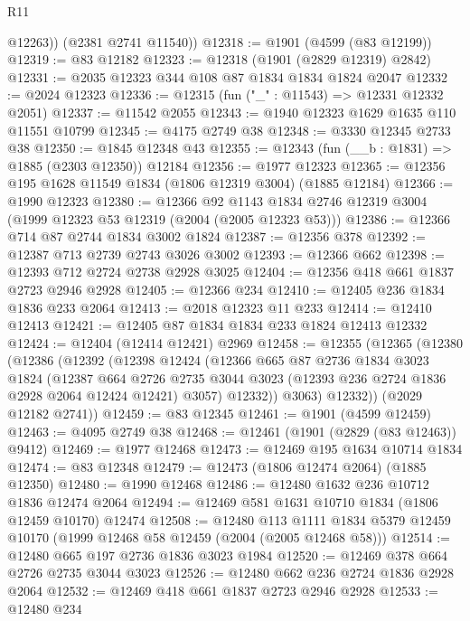 \begin{lexlean}{R11}
\begin{coremodule}
          @12263))
      (@2381 @2741 @11540))
@12318 := @1901 (@4599 (@83 @12199))
@12319 := @83 @12182
@12323 := @12318 (@1901 (@2829 @12319) @2842)
@12331 := @2035 @12323 @344 @108 @87 @1834 @1834 @1824 @2047
@12332 := @2024 @12323
@12336 := @12315 (fun ("_" : @11543) => @12331 @12332 @2051)
@12337 := @11542 @2055
@12343 := @1940 @12323 @1629 @1635 @110 @11551 @10799
@12345 := @4175 @2749 @38
@12348 := @3330 @12345 @2733 @38
@12350 := @1845 @12348 @43
@12355 := @12343 (fun (__b : @1831) => @1885 (@2303 @12350)) @12184
@12356 := @1977 @12323
@12365 := @12356 @195 @1628 @11549 @1834 (@1806 @12319 @3004) (@1885 @12184)
@12366 := @1990 @12323
@12380 := @12366
    @92
    @1143
    @1834
    @2746
    @12319
    @3004
    (@1999 @12323 @53 @12319 (@2004 (@2005 @12323 @53)))
@12386 := @12366 @714 @87 @2744 @1834 @3002 @1824
@12387 := @12356 @378
@12392 := @12387 @713 @2739 @2743 @3026 @3002
@12393 := @12366 @662
@12398 := @12393 @712 @2724 @2738 @2928 @3025
@12404 := @12356 @418 @661 @1837 @2723 @2946 @2928
@12405 := @12366 @234
@12410 := @12405 @236 @1834 @1836 @233 @2064
@12413 := @2018 @12323 @11 @233
@12414 := @12410 @12413
@12421 := @12405 @87 @1834 @1834 @233 @1824 @12413 @12332
@12424 := @12404 (@12414 @12421) @2969
@12458 := @12355
    (@12365
      (@12380
        (@12386
          (@12392
            (@12398
              @12424
              (@12366
                @665
                @87
                @2736
                @1834
                @3023
                @1824
                (@12387
                  @664
                  @2726
                  @2735
                  @3044
                  @3023
                  (@12393 @236 @2724 @1836 @2928 @2064 @12424 @12421)
                  @3057)
                @12332))
            @3063)
          @12332))
      (@2029 @12182 @2741))
@12459 := @83 @12345
@12461 := @1901 (@4599 @12459)
@12463 := @4095 @2749 @38
@12468 := @12461 (@1901 (@2829 (@83 @12463)) @9412)
@12469 := @1977 @12468
@12473 := @12469 @195 @1634 @10714 @1834
@12474 := @83 @12348
@12479 := @12473 (@1806 @12474 @2064) (@1885 @12350)
@12480 := @1990 @12468
@12486 := @12480 @1632 @236 @10712 @1836 @12474 @2064
@12494 := @12469 @581 @1631 @10710 @1834 (@1806 @12459 @10170) @12474
@12508 := @12480
    @113
    @1111
    @1834
    @5379
    @12459
    @10170
    (@1999 @12468 @58 @12459 (@2004 (@2005 @12468 @58)))
@12514 := @12480 @665 @197 @2736 @1836 @3023 @1984
@12520 := @12469 @378 @664 @2726 @2735 @3044 @3023
@12526 := @12480 @662 @236 @2724 @1836 @2928 @2064
@12532 := @12469 @418 @661 @1837 @2723 @2946 @2928
@12533 := @12480 @234

\end{coremodule}
\end{lexlean}
